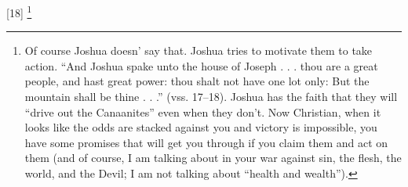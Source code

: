 [18] \footnote{Of course Joshua doesn' say that. Joshua tries to motivate them to take action. “And Joshua spake unto the house of Joseph . . . thou are a great people, and hast great power: thou shalt not have one lot only: But the mountain shall be thine . . .” (vss. 17--18). Joshua has the faith that they will ``drive out the Canaanites'' even when they don’t. Now Christian, when it looks like the odds are stacked against you and victory is impossible, you have some promises that will get you through if you claim them and act on them (and of course, I am talking about in your war against sin, the flesh, the world, and the Devil; I am not talking about “health and wealth”).}

